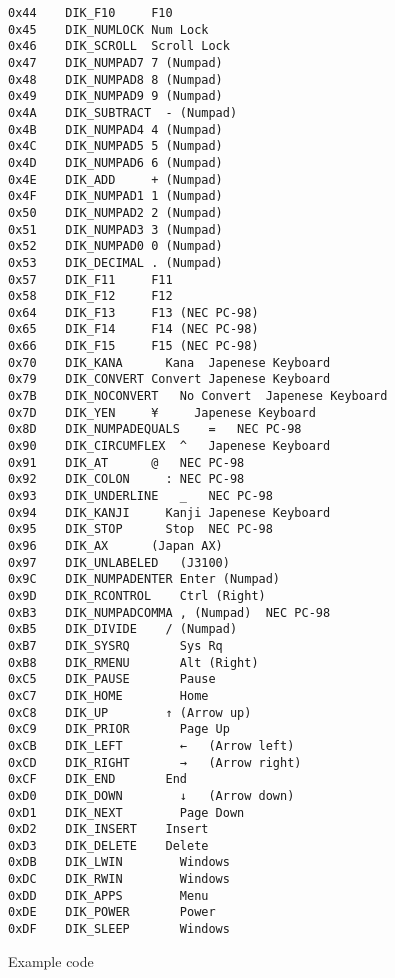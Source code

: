 \documentclass[
  openany]{book}
\begin{document}
\begin{verbatim}
0x44    DIK_F10     F10 
0x45    DIK_NUMLOCK Num Lock    
0x46    DIK_SCROLL  Scroll Lock 
0x47    DIK_NUMPAD7 7 (Numpad)  
0x48    DIK_NUMPAD8 8 (Numpad)  
0x49    DIK_NUMPAD9 9 (Numpad)  
0x4A    DIK_SUBTRACT  - (Numpad)    
0x4B    DIK_NUMPAD4 4 (Numpad)  
0x4C    DIK_NUMPAD5 5 (Numpad)  
0x4D    DIK_NUMPAD6 6 (Numpad)  
0x4E    DIK_ADD     + (Numpad)  
0x4F    DIK_NUMPAD1 1 (Numpad)  
0x50    DIK_NUMPAD2 2 (Numpad)  
0x51    DIK_NUMPAD3 3 (Numpad)  
0x52    DIK_NUMPAD0 0 (Numpad)  
0x53    DIK_DECIMAL . (Numpad)  
0x57    DIK_F11     F11 
0x58    DIK_F12     F12 
0x64    DIK_F13     F13 (NEC PC-98)
0x65    DIK_F14     F14 (NEC PC-98)
0x66    DIK_F15     F15 (NEC PC-98)
0x70    DIK_KANA      Kana  Japenese Keyboard
0x79    DIK_CONVERT Convert Japenese Keyboard
0x7B    DIK_NOCONVERT   No Convert  Japenese Keyboard
0x7D    DIK_YEN     ¥     Japenese Keyboard
0x8D    DIK_NUMPADEQUALS    =   NEC PC-98
0x90    DIK_CIRCUMFLEX  ^   Japenese Keyboard
0x91    DIK_AT      @   NEC PC-98
0x92    DIK_COLON     : NEC PC-98
0x93    DIK_UNDERLINE   _   NEC PC-98
0x94    DIK_KANJI     Kanji Japenese Keyboard
0x95    DIK_STOP      Stop  NEC PC-98
0x96    DIK_AX      (Japan AX)  
0x97    DIK_UNLABELED   (J3100) 
0x9C    DIK_NUMPADENTER Enter (Numpad)  
0x9D    DIK_RCONTROL    Ctrl (Right)    
0xB3    DIK_NUMPADCOMMA , (Numpad)  NEC PC-98
0xB5    DIK_DIVIDE    / (Numpad)    
0xB7    DIK_SYSRQ       Sys Rq  
0xB8    DIK_RMENU       Alt (Right) 
0xC5    DIK_PAUSE       Pause   
0xC7    DIK_HOME        Home    
0xC8    DIK_UP        ↑ (Arrow up)
0xC9    DIK_PRIOR       Page Up 
0xCB    DIK_LEFT        ←   (Arrow left)
0xCD    DIK_RIGHT       →   (Arrow right)
0xCF    DIK_END       End   
0xD0    DIK_DOWN        ↓   (Arrow down)
0xD1    DIK_NEXT        Page Down   
0xD2    DIK_INSERT    Insert    
0xD3    DIK_DELETE    Delete    
0xDB    DIK_LWIN        Windows 
0xDC    DIK_RWIN        Windows 
0xDD    DIK_APPS        Menu    
0xDE    DIK_POWER       Power   
0xDF    DIK_SLEEP       Windows
\end{verbatim}

Example code
\end{document}
